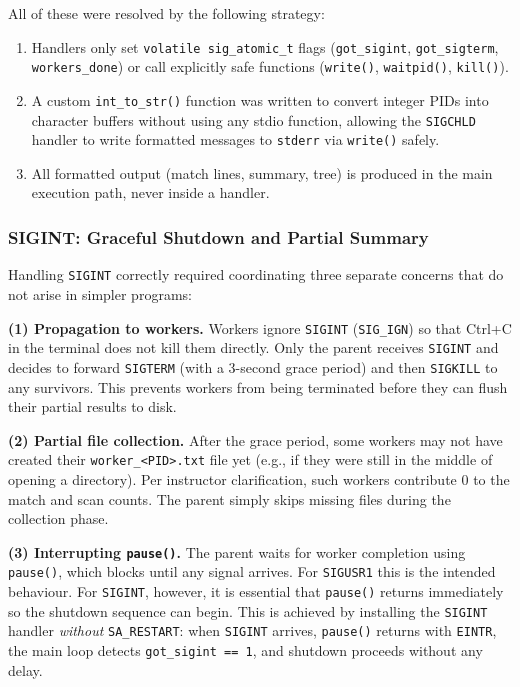 \documentclass[12pt,a4paper]{article}
\begin{document}
All of these were resolved by the following strategy:
\begin{enumerate}
    \item Handlers only set \texttt{volatile sig\_atomic\_t} flags
          (\texttt{got\_sigint}, \texttt{got\_sigterm}, \texttt{workers\_done})
          or call explicitly safe functions (\texttt{write()},
          \texttt{waitpid()}, \texttt{kill()}).
    \item A custom \texttt{int\_to\_str()} function was written to convert
          integer PIDs into character buffers without using any stdio function,
          allowing the \texttt{SIGCHLD} handler to write formatted messages to
          \texttt{stderr} via \texttt{write()} safely.
    \item All formatted output (match lines, summary, tree) is produced in the
          main execution path, never inside a handler.
\end{enumerate}

\subsubsection{SIGINT: Graceful Shutdown and Partial Summary}

Handling \texttt{SIGINT} correctly required coordinating three separate
concerns that do not arise in simpler programs:

\textbf{(1) Propagation to workers.}
Workers ignore \texttt{SIGINT} (\texttt{SIG\_IGN}) so that Ctrl+C in the
terminal does not kill them directly. Only the parent receives \texttt{SIGINT}
and decides to forward \texttt{SIGTERM} (with a 3-second grace period) and
then \texttt{SIGKILL} to any survivors. This prevents workers from being
terminated before they can flush their partial results to disk.

\textbf{(2) Partial file collection.}
After the grace period, some workers may not have created their
\texttt{worker\_<PID>.txt} file yet (e.g., if they were still in the middle of
opening a directory). Per instructor clarification, such workers contribute
0 to the match and scan counts. The parent simply skips missing files during
the collection phase.

\textbf{(3) Interrupting \texttt{pause()}.}
The parent waits for worker completion using \texttt{pause()}, which blocks
until any signal arrives. For \texttt{SIGUSR1} this is the intended behaviour.
For \texttt{SIGINT}, however, it is essential that \texttt{pause()} returns
immediately so the shutdown sequence can begin. This is achieved by installing
the \texttt{SIGINT} handler \textit{without} \texttt{SA\_RESTART}: when
\texttt{SIGINT} arrives, \texttt{pause()} returns with \texttt{EINTR}, the
main loop detects \texttt{got\_sigint == 1}, and shutdown proceeds without
any delay.
\end{document}
